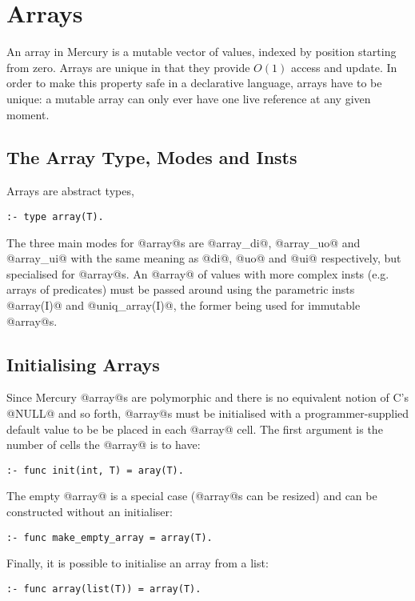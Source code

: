 
\chapter{Arrays}

An array in Mercury is a mutable vector of values, indexed by position
starting from zero.  Arrays are unique in that they provide $O(1)$
access and update.  In order to make this property safe in a declarative
language, arrays have to be unique: a mutable array can only ever have
one live reference at any given moment.

\section{The Array Type, Modes and Insts}

Arrays are abstract types,
\begin{verbatim}
:- type array(T).
\end{verbatim}

The three main modes for @array@s are @array_di@, @array_uo@ and
@array_ui@ with the same meaning as @di@, @uo@ and @ui@ respectively,
but specialised for @array@s.  An @array@ of values with more complex insts
(e.g. arrays of predicates) must be passed around using the parametric
insts @array(I)@ and @uniq_array(I)@, the former being used for
immutable @array@s.  

\section{Initialising Arrays}

Since Mercury @array@s are polymorphic and there is no equivalent notion
of C's @NULL@ and so forth, @array@s must be initialised with a
programmer-supplied default value to be be placed in each @array@
cell.  The first argument is the number of cells the @array@ is to have:
\begin{verbatim}
:- func init(int, T) = aray(T).
\end{verbatim}
The empty @array@ is a special case (@array@s can be resized) and can be
constructed without an initialiser:
\begin{verbatim}
:- func make_empty_array = array(T).
\end{verbatim}
Finally, it is possible to initialise an array from a list:
\begin{verbatim}
:- func array(list(T)) = array(T).
\end{verbatim}

